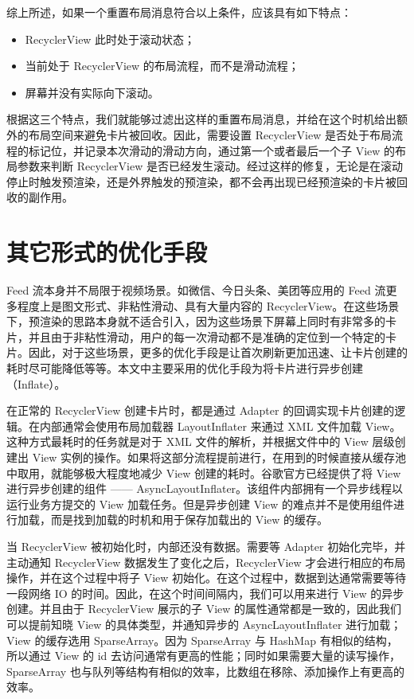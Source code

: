 综上所述，如果一个重置布局消息符合以上条件，应该具有如下特点：

\begin{itemize}
    \item RecyclerView 此时处于滚动状态；
    \item 当前处于 RecyclerView 的布局流程，而不是滑动流程；
    \item 屏幕并没有实际向下滚动。
\end{itemize}

根据这三个特点，我们就能够过滤出这样的重置布局消息，并给在这个时机给出额外的布局空间来避免卡片被回收。因此，需要设置 RecyclerView 是否处于布局流程的标记位，并记录本次滑动的滑动方向，通过第一个或者最后一个子 View 的布局参数来判断 RecyclerView 是否已经发生滚动。经过这样的修复，无论是在滚动停止时触发预渲染，还是外界触发的预渲染，都不会再出现已经预渲染的卡片被回收的副作用。

\section{其它形式的优化手段}

Feed 流本身并不局限于视频场景。如微信、今日头条、美团等应用的 Feed 流更多程度上是图文形式、非粘性滑动、具有大量内容的 RecyclerView。在这些场景下，预渲染的思路本身就不适合引入，因为这些场景下屏幕上同时有非常多的卡片，并且由于非粘性滑动，用户的每一次滑动都不是准确的定位到一个特定的卡片。因此，对于这些场景，更多的优化手段是让首次刷新更加迅速、让卡片创建的耗时尽可能降低等等。本文中主要采用的优化手段为将卡片进行异步创建（Inflate）。

在正常的 RecyclerView 创建卡片时，都是通过 Adapter 的回调实现卡片创建的逻辑。在内部通常会使用布局加载器 LayoutInflater 来通过 XML 文件加载 View。这种方式最耗时的任务就是对于 XML 文件的解析，并根据文件中的 View 层级创建出 View 实例的操作。如果将这部分流程提前进行，在用到的时候直接从缓存池中取用，就能够极大程度地减少 View 创建的耗时。谷歌官方已经提供了将 View 进行异步创建的组件 —— AsyncLayoutInflater。该组件内部拥有一个异步线程以运行业务方提交的 View 加载任务。但是异步创建 View 的难点并不是使用组件进行加载，而是找到加载的时机和用于保存加载出的 View 的缓存。

当 RecyclerView 被初始化时，内部还没有数据。需要等 Adapter 初始化完毕，并主动通知 RecyclerView 数据发生了变化之后，RecyclerView 才会进行相应的布局操作，并在这个过程中将子 View 初始化。在这个过程中，数据到达通常需要等待一段网络 IO 的时间。因此，在这个时间间隔内，我们可以用来进行 View 的异步创建。并且由于 RecyclerView 展示的子 View 的属性通常都是一致的，因此我们可以提前知晓 View 的具体类型，并通知异步的 AsyncLayoutInflater 进行加载；View 的缓存选用 SparseArray。因为 SparseArray 与 HashMap 有相似的结构，所以通过 View 的 id 去访问通常有更高的性能；同时如果需要大量的读写操作，SparseArray 也与队列等结构有相似的效率，比数组在移除、添加操作上有更高的效率。